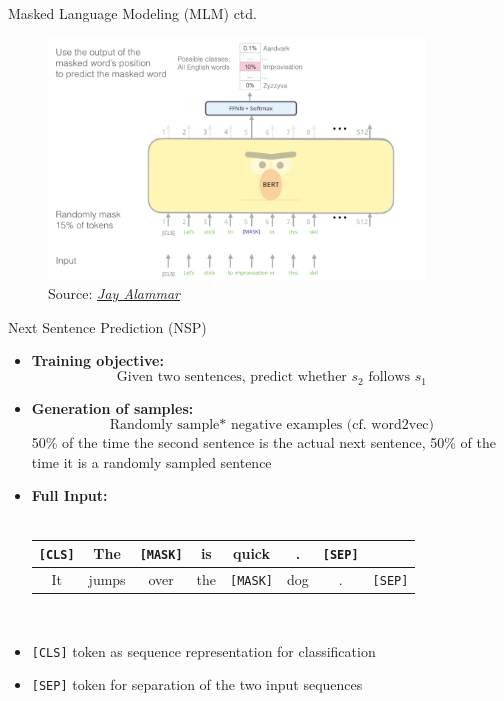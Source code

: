
\begin{vbframe}{Masked Language Modeling (MLM) ctd.}

\vfill

	\begin{figure}
		\centering
		\includegraphics[width = 10cm]{figure/bert-mlm.png}\\ 
		\footnotesize{Source:} \href{https://jalammar.github.io/illustrated-bert/}{\footnotesize \it Jay Alammar}
	\end{figure}

\vfill

\end{vbframe}


\begin{frame}{Next Sentence Prediction (NSP)}

\begin{itemize}
\item \textbf{Training objective:} $$\text{Given two sentences, predict whether $s_2$ follows $s_1$}$$
\item \textbf{Generation of samples:} $$\text{Randomly sample* negative examples (cf. word2vec)}$$
  \scriptsize *50\% of the time the second sentence is the actual next sentence, 50\% of the time it is a randomly sampled sentence
\item \normalsize \textbf{Full Input:}\\\mbox{}\\
			\footnotesize
\begin{center}
\begin{tabular}{|cccccccc|}
\hline
\cellcolor{blue!15}\texttt{[CLS]} & The & \cellcolor{blue!65}\texttt{[MASK]} & is & quick & . & \cellcolor{blue!15}\texttt{[SEP]} &\\\hline\hline It & jumps & over & the & \cellcolor{blue!65}\texttt{[MASK]} & dog & . & \cellcolor{blue!15}\texttt{[SEP]} \\
\hline
\end{tabular}\\\mbox{}
\end{center}
\item \normalsize \texttt{[CLS]} token as sequence representation for classification
\item \texttt{[SEP]} token for separation of the two input sequences
\end{itemize}

\end{frame}

